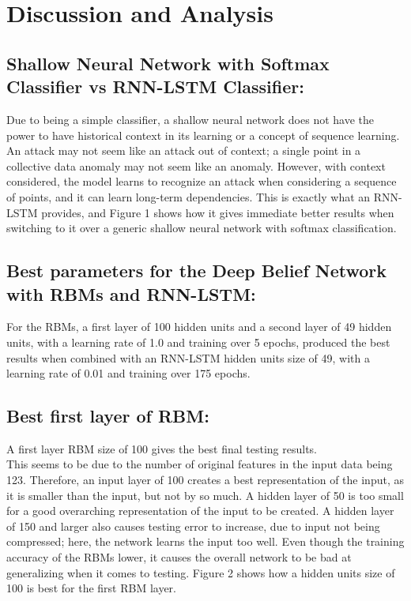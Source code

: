 \documentclass[a4paper]{article}
\begin{document}
\section{Discussion and Analysis}
\subsection{Shallow Neural Network with Softmax Classifier vs RNN-LSTM Classifier:}
\hspace*{10mm}
Due to being a simple classifier, a shallow neural network does not have the power to have historical context in its learning or a concept of sequence learning. An attack may not seem like an attack out of context; a single point in a collective data anomaly may not seem like an anomaly. However, with context considered, the model learns to recognize an attack when considering a sequence of points, and it can learn long-term dependencies. This is exactly what an RNN-LSTM provides, and Figure 1 shows how it gives immediate better results when switching to it over a generic shallow neural network with softmax classification.
\subsection{Best parameters for the Deep Belief Network with RBMs and RNN-LSTM:}
\hspace*{10mm}
For the RBMs, a first layer of 100 hidden units and a second layer of 49 hidden units, with a learning rate of 1.0 and training over 5 epochs, produced the best results when combined with an RNN-LSTM hidden units size of 49, with a learning rate of 0.01 and training over 175 epochs.

\subsection{Best first layer of RBM:}
\hspace*{10mm}
A first layer RBM size of 100 gives the best final testing results.\\
\hspace*{10mm}
This seems to be due to the number of original features in the input data being 123. Therefore, an input layer of 100 creates a best representation of the input, as it is smaller than the input, but not by so much. A hidden layer of 50 is too small for a good overarching representation of the input to be created. A hidden layer of 150 and larger also causes testing error to increase, due to input not being compressed; here, the network learns the input too well. Even though the training accuracy of the RBMs lower, it causes the overall network to be bad at generalizing when it comes to testing. Figure 2 shows how a hidden units size of 100 is best for the first RBM layer.
\end{document}
